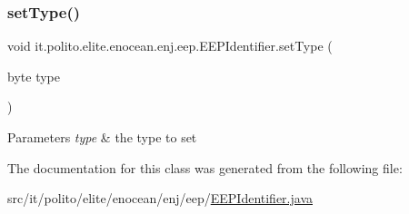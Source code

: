 \subsubsection{\texorpdfstring{set\+Type()}{setType()}}
{\footnotesize\ttfamily void it.\+polito.\+elite.\+enocean.\+enj.\+eep.\+E\+E\+P\+Identifier.\+set\+Type (\begin{DoxyParamCaption}\item[{byte}]{type }\end{DoxyParamCaption})}


\begin{DoxyParams}{Parameters}
{\em type} & the type to set \\
\hline
\end{DoxyParams}


The documentation for this class was generated from the following file\+:\begin{DoxyCompactItemize}
\item 
src/it/polito/elite/enocean/enj/eep/\hyperlink{_e_e_p_identifier_8java}{E\+E\+P\+Identifier.\+java}\end{DoxyCompactItemize}
